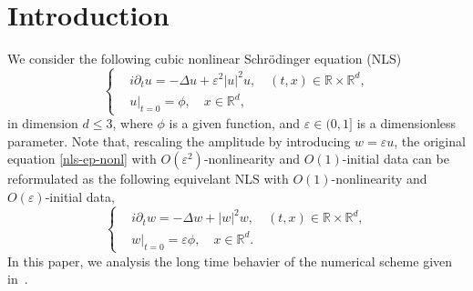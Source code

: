 \documentclass[10pt,a4paper]{article}
\begin{document}
  \section{Introduction}
  We consider the following cubic nonlinear Schr\"{o}dinger equation (NLS)
  \begin{equation}\label{nls-ep-nonl} %
    \left\{
    \begin{aligned}
      & i\partial_t u = -\Delta u + \varepsilon^2 |u|^2 u, \quad (t,x) \in
      \mathbb R\times\mathbb R^d, \\
      & u|_{t=0} = \phi, \quad x \in \mathbb R^d,
    \end{aligned}
    \right.
  \end{equation}
  in dimension \( d \leq 3 \), where \(\phi\) is a given function, and \(
  \varepsilon \in (0,1] \) is a dimensionless parameter.%
  Note that, rescaling the amplitude by introducing \(w = \varepsilon u\),
  the original equation \eqref{nls-ep-nonl} with \(O(\varepsilon^2)\)-nonlinearity and 
  \(O(1)\)-initial data can be reformulated as the following equivelant NLS
  with \(O(1)\)-nonlinearity and \(O(\varepsilon)\)-initial data,
  \begin{equation}%
    \left\{
    \begin{aligned}
      & i\partial_t w = -\Delta w + |w|^2 w, \quad (t,x) \in
      \mathbb R\times\mathbb R^d, \\
      & w|_{t=0} = \varepsilon \phi, \quad x \in \mathbb R^d.
    \end{aligned}
    \right.
  \end{equation}
  In this paper, we analysis the long time behavier of the numerical scheme
  given in~\cite{OsRoSc21}.
\end{document}
